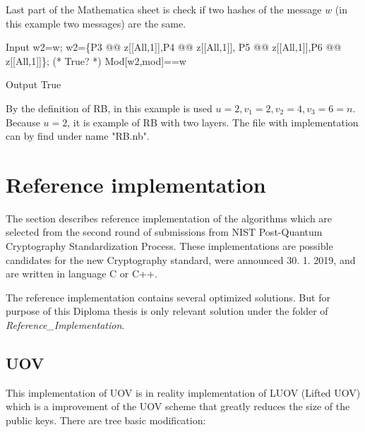\documentclass[thesis=M,english]{FITthesis}[2019/12/23]
\begin{document}
\bigskip
\noindent
Last part of the Mathematica sheet is check if two hashes of the message $w$ (in this example two messages) are the same.
\begin{mmaCell}[moredefined={w2, w, P5, P6, z, P4, P3, mod}]{Input}
  w2=w;
  w2=\{P3 @@ z[[All,1]],P4 @@ z[[All,1]],
      P5 @@ z[[All,1]],P6 @@ z[[All,1]]\};
  (* True? *)
  Mod[w2,mod]==w
\end{mmaCell}
\begin{mmaCell}[addtoindex=2]{Output}
  True
\end{mmaCell}
By the definition of RB, in this example is used $u=2, v_1=2, v_2=4, v_3=6=n$. Because $u=2$, it is example of RB with two layers.
The file with implementation can by find under name "RB.nb".

\newpage
\lstset{basicstyle=\footnotesize\ttfamily}
\section{Reference implementation}
The section describes reference implementation of the algorithms which are selected from the second round of submissions from NIST Post-Quantum Cryptography Standardization Process.\cite{L-NIST-2ND} These implementations are possible candidates for the new Cryptography standard, were announced 30. 1. 2019, and are written in language C or C++. 

\bigskip
\noindent
The reference implementation contains several optimized solutions. But for purpose of this Diploma thesis is only relevant solution under the folder of \textit{Reference\_Implementation}.

\subsection{UOV}
This implementation of UOV is in reality implementation of LUOV (Lifted UOV) which is a improvement of the UOV scheme that greatly reduces the size of the public keys. There are tree basic modification:
\end{document}
